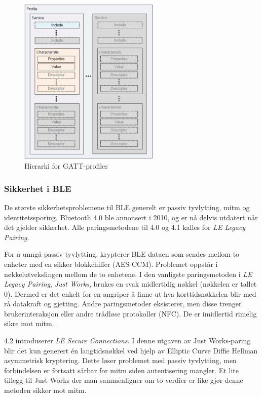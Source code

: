 \begin{figure}
\includegraphics[width=0.6\textwidth,center]{fig/gatt}
\caption{Hierarki for GATT-profiler} %
\label{fig:gatt}
\end{figure}

\subsubsection{Sikkerhet i BLE}
De største sikkerhetsproblemene til BLE generelt er passiv tyvlytting, \gls{mitm} og identitetssporing.
Bluetooth 4.0 ble annonsert i 2010, og er nå delvis utdatert når det gjelder sikkerhet. Alle paringsmetodene
til 4.0 og 4.1 kalles for \textit{LE Legacy Pairing}. 

For å unngå passiv tyvlytting, krypterer BLE dataen som sendes mellom to enheter med en sikker blokkchiffer (AES-CCM). Problemet oppstår
i nøkkelutvekslingen mellom de to enhetene. I den vanligste paringsmetoden i \textit{LE Legacy Pairing}, \textit{Just Works\texttrademark},
brukes en svak midlertidig nøkkel (nøkkelen er tallet 0). Dermed er det enkelt for en angriper å finne ut hva korttidsnøkkelen
blir med rå datakraft og gjetting. Andre paringsmetoder eksisterer, men disse trenger brukerinteraksjon eller andre trådløse protokoller (NFC).
De er imidlertid rimelig sikre mot \gls{mitm}.

4.2 introduserer \textit{LE Secure Connections}. I denne utgaven av Just Works\texttrademark-paring blir det kun generert
én langtidsnøkkel ved hjelp av Elliptic Curve Diffie Hellman asymmetrisk kryptering. Dette løser problemet med passiv
tyvlytting, men forbindelsen er fortsatt sårbar for \gls{mitm} siden autentisering mangler. Et lite tillegg til Just Works\texttrademark
der man sammenligner om to verdier er like gjør denne metoden sikker mot \gls{mitm}.

